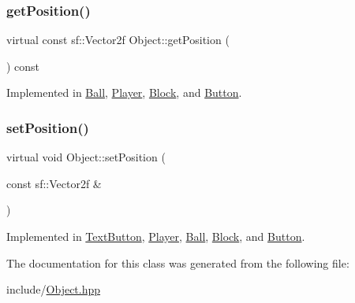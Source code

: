 \mbox{\label{class_object_a3fd6370b8cfc53e5e41d09704726c2d4}} 
\subsubsection{\texorpdfstring{getPosition()}{getPosition()}}
{\footnotesize\ttfamily virtual const sf\+::\+Vector2f Object\+::get\+Position (\begin{DoxyParamCaption}{ }\end{DoxyParamCaption}) const\hspace{0.3cm}{\ttfamily [pure virtual]}}



Implemented in \mbox{\hyperlink{class_ball_a672da3b511f6b30fde82a63927fe8174}{Ball}}, \mbox{\hyperlink{class_player_a6599dac14c1f2ac94e9160c99376333e}{Player}}, \mbox{\hyperlink{class_block_ae7621aaed284804fc898174207eb1587}{Block}}, and \mbox{\hyperlink{class_button_a01ff4aace35c7d0c4d8b35eda290378f}{Button}}.

\mbox{\label{class_object_ac5c796bfa75dedf6d3bfc74685b2b77d}} 
\subsubsection{\texorpdfstring{setPosition()}{setPosition()}}
{\footnotesize\ttfamily virtual void Object\+::set\+Position (\begin{DoxyParamCaption}\item[{const sf\+::\+Vector2f \&}]{ }\end{DoxyParamCaption})\hspace{0.3cm}{\ttfamily [pure virtual]}}



Implemented in \mbox{\hyperlink{class_text_button_a4550c33ce65f77b9e9e119526bfcc357}{Text\+Button}}, \mbox{\hyperlink{class_player_a9f37a6ecb0abbea3eed1348266135879}{Player}}, \mbox{\hyperlink{class_ball_af2260b5f0b9b20d4974ada97481004f3}{Ball}}, \mbox{\hyperlink{class_block_a9c4782f321b4760d572a01bd31c42a06}{Block}}, and \mbox{\hyperlink{class_button_a95a9aafc24ed5d95d3557f7155832433}{Button}}.



The documentation for this class was generated from the following file\+:\begin{DoxyCompactItemize}
\item 
include/\mbox{\hyperlink{_object_8hpp}{Object.\+hpp}}\end{DoxyCompactItemize}
